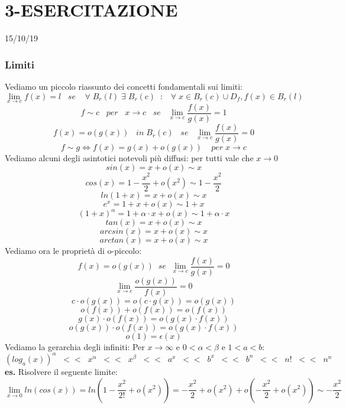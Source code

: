 \section*{3-ESERCITAZIONE}
15/10/19
\subsubsection*{Limiti}
Vediamo un piccolo riassunto dei concetti fondamentali sui limiti:
\[
    \lim_{x\rightarrow c} f(x) = l \;\;\;se \;\;\; \;\forall\;B_r(l) \;\exists \; B_r(c) \;\;:\;\; \;\forall\;x \in B_r(c) \cup D_f , f(x) \in B_r(l)
\]
\[
    f \sim c \;\;\; per \;\;\; x \rightarrow c \;\;\; se \;\;\; \lim_{x\rightarrow c}\frac{f(x)}{g(x)} = 1
\]
\newline
\[
    f(x) = o(g(x)) \;\;\; in \; B_r(c) \;\;\; se \;\;\; \lim_{x\rightarrow c} \frac{f(x)}{g(x)}= 0
\]
\newline
\[
    f \sim  g \Longleftrightarrow f(x) = g(x) + o(g(x)) \;\;\;\; per \; x \rightarrow c
\]
\newline
Vediamo alcuni degli asintotici notevoli più diffusi:
\newline
per tutti vale che $x \rightarrow 0$
\[
    sin(x) = x + o(x) \sim x
\]
\[
    cos(x) = 1- \frac{x^2}{2} + o(x^2) \sim  1- \frac{x^2}{2}
\]
\[
    ln(1+x) = x+o(x) \sim x
\]
\[
    e^x=1+x+o(x) \sim 1+x
\]
\[
    (1+x)^{\alpha} = 1 + \alpha \cdot x + o(x) \sim 1 + \alpha \cdot x 
\]
\[
    tan(x) = x + o(x) \sim x
\]
\[
    arcsin(x) = x + o(x) \sim x
\]
\[
    arctan(x) = x + o(x) \sim x
\]
\newline
Vediamo ora le proprietà di o-piccolo:
\[
    f(x) = o(g(x)) \;\; se \;\; \lim_{x\rightarrow c} \frac{f(x)}{g(x)} = 0
\]
\[
    \lim_{x\rightarrow c} \frac{o(g(x))}{f(x)} = 0
\]
\[
    c \cdot o(g(x)) = o (c \cdot g(x)) = o(g(x))
\]
\[
    o(f(x)) + o(f(x)) = o(f(x))
\]
\[
    g(x) \cdot o(f(x)) = o(g(x) \cdot  f(x))
\]
\[
    o(g(x)) \cdot  o(f(x)) = o(g(x) \cdot f(x))
\]
\[
    o(1) = \epsilon(x)
\]
\newline
Vediamo la gerarchia degli infiniti:
\newline
Per $x \rightarrow  \infty$ e $0 < \alpha < \beta$ e $1 < a < b$:
\[
    (log_a(x))^\alpha \;\; << \;\; x^\alpha \;\; << \;\; x^\beta \;\;<<\;\;a ^ x \;\;<<\;\;b^x \;\;<<\;\; b^n \;\;<<\;\; n! \;\;<<\;\;n^n
\]
\newline
\newline
\textbf{es.} Risolvere il seguente limite:
\[
    \lim_{x\rightarrow 0} ln(cos(x)) = ln(1- \frac{x^2}{2!} + o(x^2))= - \frac{x^2}{2} + o(x^2) + o(-\frac{x^2}{2}+o(x^2)) \sim  - \frac{x^2}{2}
\]
